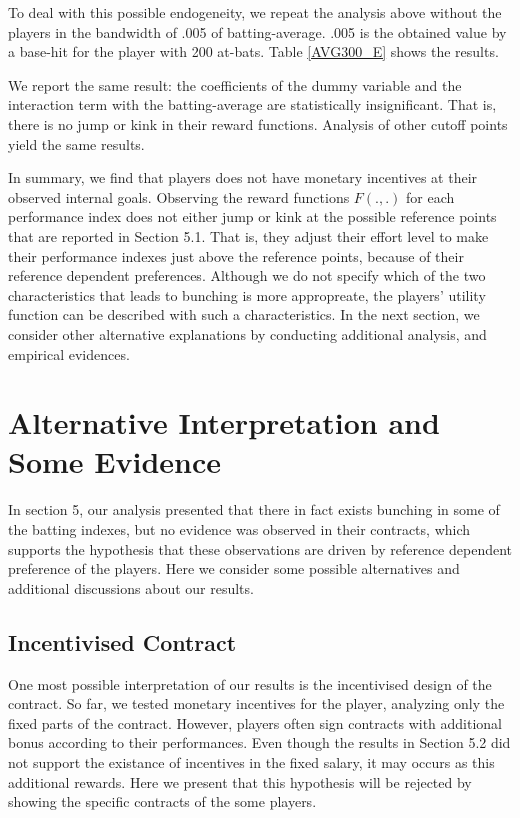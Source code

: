 \documentclass[dvipdfmx, 12pt]{article}
\begin{document}
To deal with this possible endogeneity, we repeat the analysis above without the players in the bandwidth of .005 of batting-average. .005 is the obtained value by a base-hit for the player with 200 at-bats. Table \ref{AVG300_E} shows the results.

We report the same result: the coefficients of the dummy variable and the interaction term with the batting-average are statistically insignificant. That is, there is no jump or kink in their reward functions. Analysis of other cutoff points yield the same results.

In summary, we find that players does not have monetary incentives at their observed internal goals. Observing the reward functions $F(.,.)$ for each performance index does not either jump or kink at the possible reference points that are reported in Section 5.1. That is, they adjust their effort level to make their performance indexes just above the reference points, because of their reference dependent preferences. Although we do not specify which of the two characteristics that leads to bunching is more appropreate, the players' utility function can be described with such a characteristics. In the next section, we consider other alternative explanations by conducting additional analysis, and empirical evidences.



\section{Alternative Interpretation and Some Evidence}

In section 5, our analysis presented that there in fact exists bunching in some of the batting indexes, but no evidence was observed in their contracts, which supports the hypothesis that these observations are driven by reference dependent preference of the players. Here we consider some possible alternatives and additional discussions about our results.

\subsection{Incentivised Contract}

One most possible interpretation of our results is the incentivised design of the contract. So far, we tested monetary incentives for the player, analyzing only the fixed parts of the contract. However, players often sign contracts with additional bonus according to their performances. Even though the results in Section 5.2 did not support the existance of incentives in the fixed salary, it may occurs as this additional rewards. Here we present that this hypothesis will be rejected by showing the specific contracts of the some players.
\end{document}
